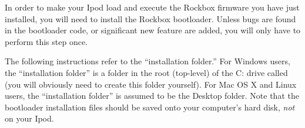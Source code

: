 
%
%
%
%
%
%
%

In order to make your Ipod load and execute the Rockbox firmware you have just 
installed, you will need to install the Rockbox bootloader. Unless bugs are 
found in the bootloader code, or significant new feature are added, you will 
only have to perform this step once.

The following instructions refer to the ``installation folder.''  For Windows 
users, the ``installation folder'' is a folder in the root (top-level) of the C: 
drive called  (you will obviously need to create 
this folder yourself).  For Mac OS X and Linux users, the ``installation 
folder'' is assumed to be the Desktop folder.  Note that the bootloader 
installation files should be saved onto your computer's hard disk, \emph{not} on 
your Ipod. 

